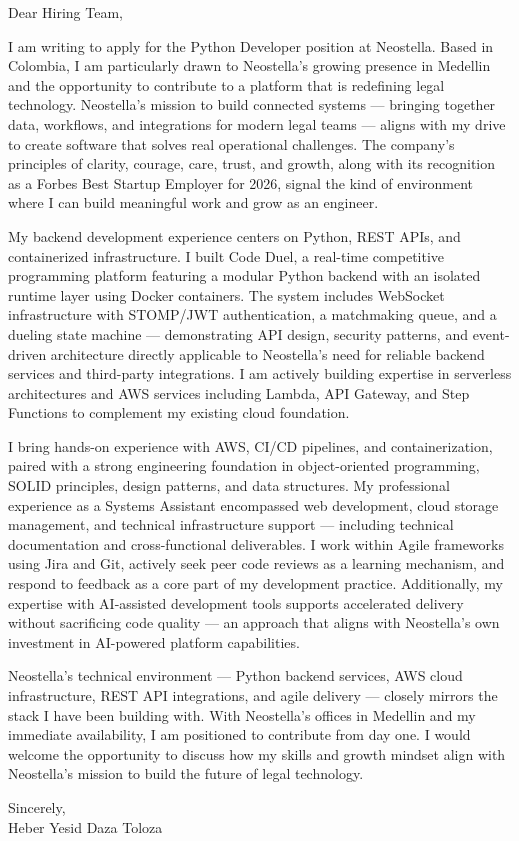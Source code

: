 \documentclass{cover}
\begin{document}
\makeheader
\makesubject

\begin{coverbody}
Dear Hiring Team,

I am writing to apply for the Python Developer position at Neostella. Based in Colombia, I am particularly drawn to Neostella's growing presence in Medellin and the opportunity to contribute to a platform that is redefining legal technology. Neostella's mission to build connected systems --- bringing together data, workflows, and integrations for modern legal teams --- aligns with my drive to create software that solves real operational challenges. The company's principles of clarity, courage, care, trust, and growth, along with its recognition as a Forbes Best Startup Employer for 2026, signal the kind of environment where I can build meaningful work and grow as an engineer.

My backend development experience centers on Python, REST APIs, and containerized infrastructure. I built Code Duel, a real-time competitive programming platform featuring a modular Python backend with an isolated runtime layer using Docker containers. The system includes WebSocket infrastructure with STOMP/JWT authentication, a matchmaking queue, and a dueling state machine --- demonstrating API design, security patterns, and event-driven architecture directly applicable to Neostella's need for reliable backend services and third-party integrations. I am actively building expertise in serverless architectures and AWS services including Lambda, API Gateway, and Step Functions to complement my existing cloud foundation.

I bring hands-on experience with AWS, CI/CD pipelines, and containerization, paired with a strong engineering foundation in object-oriented programming, SOLID principles, design patterns, and data structures. My professional experience as a Systems Assistant encompassed web development, cloud storage management, and technical infrastructure support --- including technical documentation and cross-functional deliverables. I work within Agile frameworks using Jira and Git, actively seek peer code reviews as a learning mechanism, and respond to feedback as a core part of my development practice. Additionally, my expertise with AI-assisted development tools supports accelerated delivery without sacrificing code quality --- an approach that aligns with Neostella's own investment in AI-powered platform capabilities.

Neostella's technical environment --- Python backend services, AWS cloud infrastructure, REST API integrations, and agile delivery --- closely mirrors the stack I have been building with. With Neostella's offices in Medellin and my immediate availability, I am positioned to contribute from day one. I would welcome the opportunity to discuss how my skills and growth mindset align with Neostella's mission to build the future of legal technology.

Sincerely,\\[1em]
Heber Yesid Daza Toloza
\end{coverbody}
\end{document}
